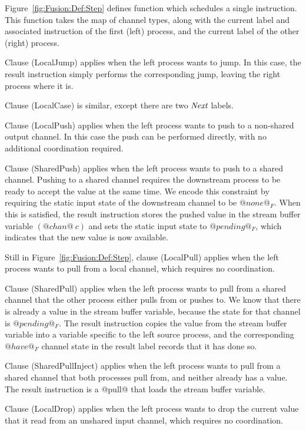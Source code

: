 


\smallskip
Figure~\ref{fig:Fusion:Def:Step} defines function  which schedules a single instruction. This function takes the map of channel types, along with the current label and associated instruction of the first (left) process, and the current label of the other (right) process.

Clause (LocalJump) applies when the left process wants to jump.
In this case, the result instruction simply performs the corresponding jump, leaving the right process where it is. 

Clause (LocalCase) is similar, except there are two $\textit{Next}$ labels.

Clause (LocalPush) applies when the left process wants to push to a non-shared output channel.
In this case the push can be performed directly, with no additional coordination required.

Clause (SharedPush) applies when the left process wants to push to a shared channel. Pushing to a shared channel requires the downstream process to be ready to accept the value at the same time. We encode this constraint by requiring the static input state of the downstream channel to be $@none@_F$. When this is satisfied, the result instruction stores the pushed value in the stream buffer variable $(@chan@~c)$ and sets the static input state to $@pending@_F$, which indicates that the new value is now available. 

Still in Figure~\ref{fig:Fusion:Def:Step}, clause (LocalPull) applies when the left process wants to pull from a local channel, which requires no coordination.

Clause (SharedPull) applies when the left process wants to pull from a shared channel that the other process either pulls from or pushes to. We know that there is already a value in the stream buffer variable, because the state for that channel is $@pending@_F$. The result instruction copies the value from the stream buffer variable into a variable specific to the left source process, and the corresponding $@have@_F$ channel state in the result label records that it has done so.

Clause (SharedPullInject) applies when the left process wants to pull from a shared channel that both processes pull from, and neither already has a value. The result instruction is a @pull@ that loads the stream buffer variable.

Clause (LocalDrop) applies when the left process wants to drop the current value that it read from an unshared input channel, which requires no coordination.

